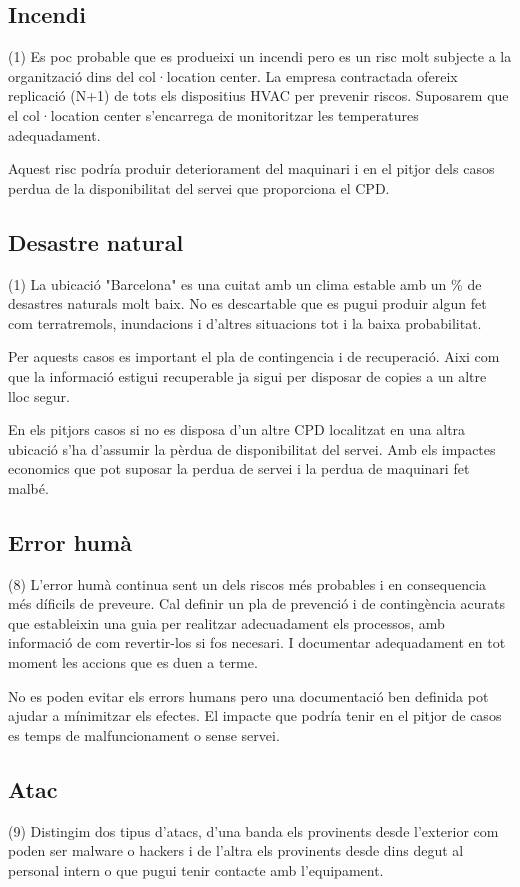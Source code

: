 \documentclass[a4paper, 11pt]{article}
\begin{document}
\subsection{Incendi}
(1) Es poc probable que es produeixi un incendi pero es un risc molt subjecte a la organització dins del col·location center. La empresa contractada ofereix replicació (N+1) de tots els dispositius HVAC per prevenir riscos. Suposarem que el col·location center s'encarrega de monitoritzar les temperatures adequadament.

Aquest risc podría produir deteriorament del maquinari i en el pitjor dels casos perdua de la disponibilitat del servei que proporciona el CPD. 

\subsection{Desastre natural}
(1) La ubicació "Barcelona" es una cuitat amb un clima estable amb un \% de desastres naturals molt baix. No es descartable que es pugui produir algun fet com terratremols, inundacions i d'altres situacions tot i la baixa probabilitat.

Per aquests casos es important el pla de contingencia i de recuperació. Aixi com que la informació estigui recuperable ja sigui per disposar de copies a un altre lloc segur.

En els pitjors casos si no es disposa d'un altre CPD localitzat en una altra ubicació s'ha d'assumir la pèrdua de disponibilitat del servei. Amb els impactes economics que pot suposar la perdua de servei i la perdua de maquinari fet malbé.

\subsection{Error humà}
(8) L'error humà continua sent un dels riscos més probables i en consequencia més díficils de preveure. Cal definir un pla de prevenció i de contingència acurats que estableixin una guia per realitzar adecuadament els processos, amb informació de com revertir-los si fos necesari. I documentar adequadament en tot moment les accions que es duen a terme.

No es poden evitar els errors humans pero una documentació ben definida pot ajudar a mínimitzar els efectes. El impacte que podría tenir en el pitjor de casos es temps de malfuncionament o sense servei. 

\subsection{Atac}
(9) Distingim dos tipus d'atacs, d'una banda els provinents desde l'exterior com poden ser malware o hackers i de l'altra els provinents desde dins degut al personal intern o que pugui tenir contacte amb l'equipament. 
\end{document}
